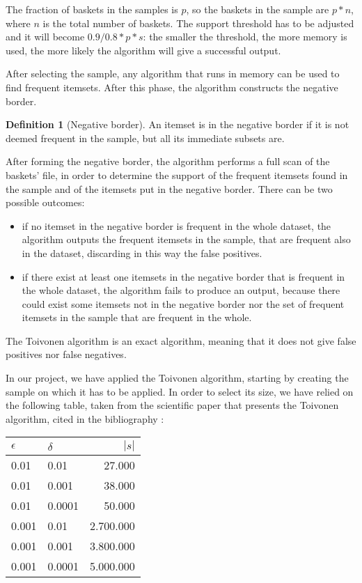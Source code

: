\documentclass[conference,compsoc]{IEEEtran}
\theoremstyle{definition}
\newtheorem{definition}{Definition}[section]
\begin{document}
The fraction of baskets in the samples is \(p\), so the baskets in the sample are \(p*n\), where \(n\) is the total number of baskets. The support threshold has to be adjusted and it will become \(0.9/0.8*p*s\): the smaller the threshold, the more memory is used, the more likely the algorithm will give a successful output. 

After selecting the sample, any algorithm that runs in memory can be used to find frequent itemsets. After this phase, the algorithm constructs the negative border. 

\begin{definition}[Negative border]\label{def:3.3}
An itemset is in the negative border if it is not deemed frequent in the sample, but all its immediate subsets are.
\end{definition}

After forming the negative border, the algorithm performs a full scan of the baskets' file, in order to determine the support of the frequent itemsets found in the sample and of the itemsets put in the negative border. There can be two possible outcomes:
\begin{itemize}
    \item if no itemset in the negative border is frequent in the whole dataset, the algorithm outputs the frequent itemsets in the sample, that are frequent also in the dataset, discarding in this way the false positives.
    \item if there exist at least one itemsets in the negative border that is frequent in the whole dataset, the algorithm fails to produce an output, because there could exist some itemsets not in the negative border nor the set of frequent itemsets in the sample that are frequent in the whole. 
\end{itemize}

The Toivonen algorithm is an exact algorithm, meaning that it does not give false positives nor false negatives.

In our project, we have applied the Toivonen algorithm, starting by creating the sample on which it has to be applied. In order to select its size, we have relied on the following table, taken from the scientific paper that presents the Toivonen algorithm, cited in the bibliography \cite{Toivonen}:

\begin{center}
\begin{tabular}{ |l|l|r| }
    \hline
    \(\epsilon\) & \(\delta\) & \(|s|\) \\ 
    \hline\hline
    0.01 & 0.01 & 27.000 \\
    \hline
    0.01 & 0.001 & 38.000 \\
    \hline
    0.01 & 0.0001 & 50.000 \\
    \hline
    0.001 & 0.01 & 2.700.000 \\
    \hline
    0.001 & 0.001 & 3.800.000 \\
    \hline
    0.001 & 0.0001 & 5.000.000 \\
    \hline
\end{tabular}    
\end{center}
\end{document}
